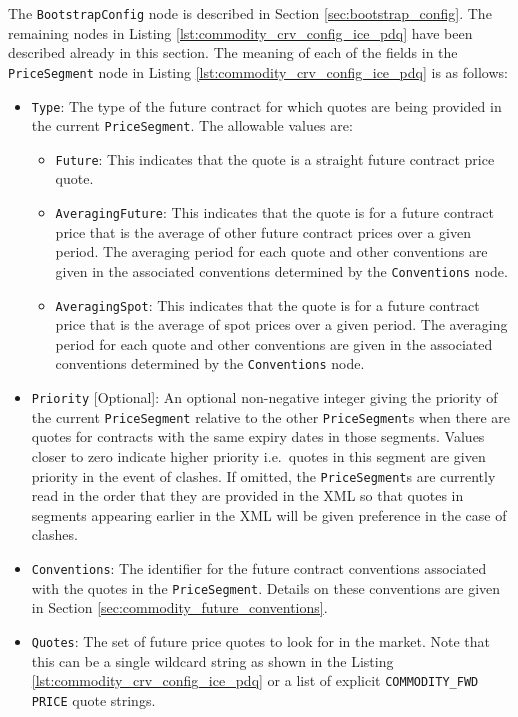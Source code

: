 \documentclass[12pt, a4paper]{article}
\begin{document}
{{The \lstinline!BootstrapConfig! node is described in Section \ref{sec:bootstrap_config}. The remaining nodes in Listing \ref{lst:commodity_crv_config_ice_pdq} have been described already in this section. The meaning of each of the fields in the \lstinline!PriceSegment! node in Listing \ref{lst:commodity_crv_config_ice_pdq} is as follows:
\begin{itemize}
\item \lstinline!Type!:
The type of the future contract for which quotes are being provided in the current \lstinline!PriceSegment!. The allowable values are:
    \begin{itemize}
    \item \lstinline!Future!: This indicates that the quote is a straight future contract price quote.
    \item \lstinline!AveragingFuture!: This indicates that the quote is for a future contract price that is the average of other future contract prices over a given period. The averaging period for each quote and other conventions are given in the associated conventions determined by the \lstinline!Conventions! node.
    \item \lstinline!AveragingSpot!: This indicates that the quote is for a future contract price that is the average of spot prices over a given period. The averaging period for each quote and other conventions are given in the associated conventions determined by the \lstinline!Conventions! node.
    \end{itemize}

\item \lstinline!Priority! [Optional]:
An optional non-negative integer giving the priority of the current \lstinline!PriceSegment! relative to the other \lstinline!PriceSegment!s when there are quotes for contracts with the same expiry dates in those segments. Values closer to zero indicate higher priority i.e.\ quotes in this segment are given priority in the event of clashes. If omitted, the \lstinline!PriceSegment!s are currently read in the order that they are provided in the XML so that quotes in segments appearing earlier in the XML will be given preference in the case of clashes.

\item \lstinline!Conventions!:
The identifier for the future contract conventions associated with the quotes in the \lstinline!PriceSegment!. Details on these conventions are given in Section \ref{sec:commodity_future_conventions}.

\item \lstinline!Quotes!:
The set of future price quotes to look for in the market. Note that this can be a single wildcard string as shown in the Listing \ref{lst:commodity_crv_config_ice_pdq} or a list of explicit \lstinline!COMMODITY_FWD! \lstinline!PRICE! quote strings.


\end{itemize}}}
\end{document}
